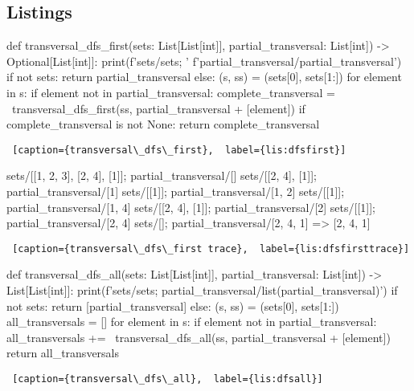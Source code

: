 \clearpage
\subsection{Listings}\label{sec:listings}

\begin{center}

\begin{minipage}{\linewidth}
\begin{python}[numbers=left]
def transversal_dfs_first(sets: List[List[int]],
                          partial_transversal: List[int]) 
                          -> Optional[List[int]]:
  print(f'sets/{sets}; '
        f'partial_transversal/{partial_transversal}')  
  if not sets:
    return partial_transversal
  else:
    (s, ss) = (sets[0], sets[1:])
    for element in s:
      if element not in partial_transversal:
        complete_transversal = \
          transversal_dfs_first(ss, partial_transversal + [element])
        if complete_transversal is not None:
          return complete_transversal    
\end{python}
\begin{lstlisting} [caption={transversal\_dfs\_first},  label={lis:dfsfirst}]
\end{lstlisting}
\end{minipage}


\begin{minipage}{\linewidth}

\begin{python}[numbers=left]
sets/[[1, 2, 3], [2, 4], [1]]; partial_transversal/[]
sets/[[2, 4], [1]]; partial_transversal/[1]
sets/[[1]]; partial_transversal/[1, 2]
sets/[[1]]; partial_transversal/[1, 4]
sets/[[2, 4], [1]]; partial_transversal/[2]
sets/[[1]]; partial_transversal/[2, 4]
sets/[]; partial_transversal/[2, 4, 1]
                                =>  [2, 4, 1]
\end{python}
\begin{lstlisting} [caption={transversal\_dfs\_first trace},  label={lis:dfsfirsttrace}]
\end{lstlisting}
\end{minipage}


\begin{minipage}{\linewidth}
\begin{python}[numbers=left]
def transversal_dfs_all(sets: List[List[int]],
                        partial_transversal: List[int]) 
                        -> List[List[int]]:
  print(f'sets/{sets}; partial_transversal/{list(partial_transversal)}')
  if not sets:
    return [partial_transversal]
  else:
    (s, ss) = (sets[0], sets[1:])
    all_transversals = []
    for element in s:
      if element not in partial_transversal:
        all_transversals += \
          transversal_dfs_all(ss, partial_transversal + [element])
    return all_transversals
\end{python}
\begin{lstlisting} [caption={transversal\_dfs\_all},  label={lis:dfsall}]
\end{lstlisting}
\end{minipage}



\end{center}

